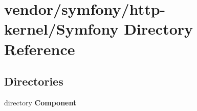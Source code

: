 \section{vendor/symfony/http-\/kernel/\+Symfony Directory Reference}
\label{dir_e39472f2531121e8c5b56692c3d3b127}
\subsection*{Directories}
\begin{DoxyCompactItemize}
\item 
directory {\bf Component}
\end{DoxyCompactItemize}
